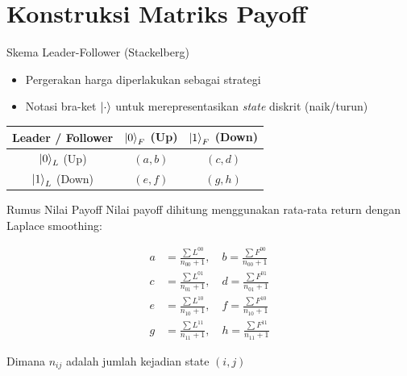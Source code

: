 \documentclass[aspectratio=169]{beamer}
\begin{document}
\section{Konstruksi Matriks Payoff}

\begin{frame}{Skema Leader-Follower (Stackelberg)}
    \begin{itemize}
        \item Pergerakan harga diperlakukan sebagai strategi
        \item Notasi bra-ket $\ket{\cdot}$ untuk merepresentasikan \textit{state} diskrit (naik/turun)
    \end{itemize}
    
    \vspace{0.5cm}
    
    \begin{table}
        \centering
        \begin{tabular}{c|c|c}
            \toprule
            \textbf{Leader / Follower} & $\ket{0}_F$ (Up) & $\ket{1}_F$ (Down) \\
            \midrule
            $\ket{0}_L$ (Up) & $(a, b)$ & $(c, d)$ \\
            $\ket{1}_L$ (Down) & $(e, f)$ & $(g, h)$ \\
            \bottomrule
        \end{tabular}
    \end{table}
\end{frame}

\begin{frame}{Rumus Nilai Payoff}
    Nilai payoff dihitung menggunakan rata-rata return dengan Laplace smoothing:
    
    \begin{align}
        a &= \frac{\sum L^{00}}{n_{00} + 1}, \quad b = \frac{\sum F^{00}}{n_{00} + 1} \\[10pt]
        c &= \frac{\sum L^{01}}{n_{01} + 1}, \quad d = \frac{\sum F^{01}}{n_{01} + 1} \\[10pt]
        e &= \frac{\sum L^{10}}{n_{10} + 1}, \quad f = \frac{\sum F^{10}}{n_{10} + 1} \\[10pt]
        g &= \frac{\sum L^{11}}{n_{11} + 1}, \quad h = \frac{\sum F^{11}}{n_{11} + 1}
    \end{align}
    
    \vspace{0.3cm}
    Dimana $n_{ij}$ adalah jumlah kejadian state $(i,j)$
\end{frame}
\end{document}

